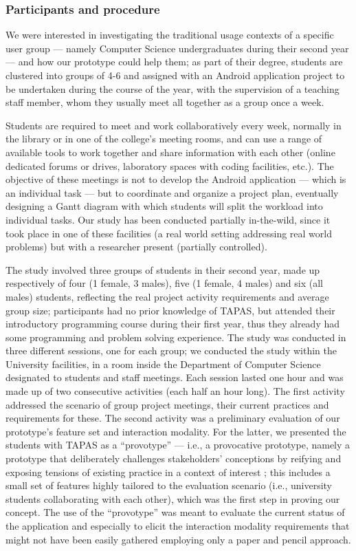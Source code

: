 \subsubsection{Participants and procedure}
We were interested in investigating the traditional usage contexts of a specific user group --- namely Computer Science undergraduates during their second year --- and how our prototype could help them; as part of their degree, students are clustered into groups of 4-6 and assigned with an Android application project to be undertaken during the course of the year, with the supervision of a teaching staff member, whom they usually meet all together as a group once a week. 

Students are required to meet and work collaboratively every week, normally in the library or in one of the college's meeting rooms, and can use a range of available tools to work together and share information with each other (online dedicated forums or drives, laboratory spaces with coding facilities, etc.). The objective of these meetings is not to develop the Android application --- which is an individual task --- but to coordinate and organize a project plan, eventually designing a Gantt diagram with which students will split the workload into individual tasks. Our study has been conducted partially in-the-wild, since it took place in one of these facilities (a real world setting addressing real world problems) but with a researcher present (partially controlled).

The study involved three groups of students in their second year, made up respectively of four (1 female, 3 males), five (1 female, 4 males) and six (all males) students, reflecting the real project activity requirements and average group size; participants had no prior knowledge of \acs{TAPAS}, but attended their introductory programming course during their first year, thus they already had some programming and problem solving experience. The study was conducted in three different sessions, one for each group; we conducted the study within the University facilities, in a room inside the Department of Computer Science designated to students and staff meetings. Each session lasted one hour and was made up of two consecutive activities (each half an hour long). The first activity addressed the scenario of group project meetings, their current practices and requirements for these. The second activity was a preliminary evaluation of our prototype's feature set and interaction modality. For the latter, we presented the students with \acs{TAPAS} as a ``provotype'' --- i.e., a provocative prototype, namely a prototype that deliberately challenges stakeholders' conceptions by reifying and exposing tensions of existing practice in a context of interest \cite{Boer:2012ku}; this includes a small set of features highly tailored to the evaluation scenario (i.e., university students collaborating with each other), which was the first step in proving our concept. The use of the ``provotype'' was meant to evaluate the current status of the application and especially to elicit the interaction modality requirements that might not have been easily gathered employing only a paper and pencil approach.

